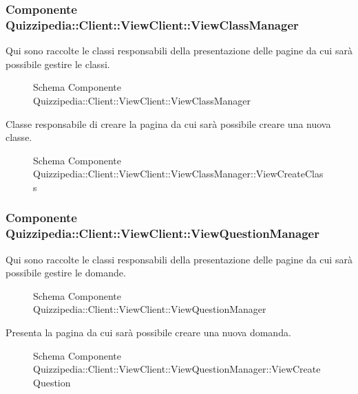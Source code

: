 \subsubsection{Componente Quizzipedia::Client::ViewClient::ViewClassManager}
Qui sono raccolte le classi responsabili della presentazione delle pagine da cui sarà possibile gestire le classi.
\begin{figure}[H]
\centering
\noindent{}
\caption{Schema Componente Quizzipedia::Client::ViewClient::ViewClassManager}
\end{figure}
Classe responsabile di creare la pagina da cui sarà possibile creare una nuova classe.
\begin{figure}[H]
\centering
\noindent{}
\caption{Schema Componente Quizzipedia::Client::ViewClient::ViewClassManager::ViewCreateClass}
\end{figure}
\subsubsection{Componente Quizzipedia::Client::ViewClient::ViewQuestionManager}
Qui sono raccolte le classi responsabili della presentazione delle pagine da cui sarà possibile gestire le domande.
\begin{figure}[H]
\centering
\noindent{}
\caption{Schema Componente Quizzipedia::Client::ViewClient::ViewQuestionManager}
\end{figure}
Presenta la pagina da cui sarà possibile creare una nuova domanda.
\begin{figure}[H]
\centering
\noindent{}
\caption{Schema Componente Quizzipedia::Client::ViewClient::ViewQuestionManager::ViewCreateQuestion}
\end{figure}
